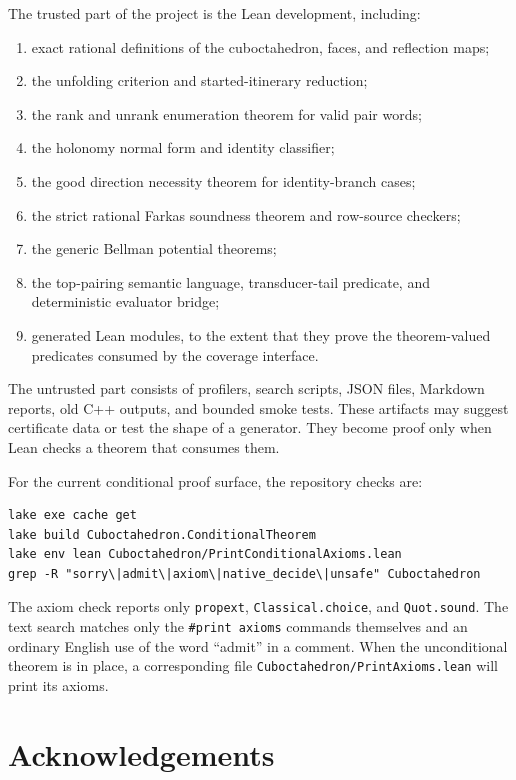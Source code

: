 \documentclass[11pt]{article}
\begin{document}
The trusted part of the project is the Lean development, including:
\begin{enumerate}[leftmargin=2em]
\item exact rational definitions of the cuboctahedron, faces, and reflection
  maps;
\item the unfolding criterion and started-itinerary reduction;
\item the rank and unrank enumeration theorem for valid pair words;
\item the holonomy normal form and identity classifier;
\item the good direction necessity theorem for identity-branch cases;
\item the strict rational Farkas soundness theorem and row-source checkers;
\item the generic Bellman potential theorems;
\item the top-pairing semantic language, transducer-tail predicate, and
  deterministic evaluator bridge;
\item generated Lean modules, to the extent that they prove the
  theorem-valued predicates consumed by the coverage interface.
\end{enumerate}

The untrusted part consists of profilers, search scripts, JSON files,
Markdown reports, old C++ outputs, and bounded smoke tests.  These artifacts
may suggest certificate data or test the shape of a generator.  They become
proof only when Lean checks a theorem that consumes them.

For the current conditional proof surface, the repository checks are:
\begin{verbatim}
lake exe cache get
lake build Cuboctahedron.ConditionalTheorem
lake env lean Cuboctahedron/PrintConditionalAxioms.lean
grep -R "sorry\|admit\|axiom\|native_decide\|unsafe" Cuboctahedron
\end{verbatim}
The axiom check reports only \texttt{propext}, \texttt{Classical.choice},
and \texttt{Quot.sound}.  The text search matches only the
\verb|#print axioms| commands themselves and an ordinary English use of the
word ``admit'' in a comment.  When the unconditional theorem is in place, a
corresponding file \texttt{Cuboctahedron/PrintAxioms.lean} will print its
axioms.

\section*{Acknowledgements}
\end{document}
